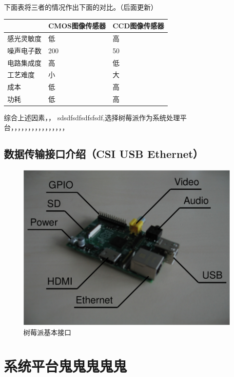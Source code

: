 下面表将三者的情况作出下面的对比。（后面更新）

\begin{table}[ht]
	
	\begin{tabular}{|L{2.2cm}|C{4cm}|R{4cm}|}
		\toprule[1pt]
		\hline
		& CMOS图像传感器 & CCD图像传感器 \\ \hline
		感光灵敏度 & 低 & 高 \\ \hline
		噪声电子数 & 200 & 50 \\ \hline
		电路集成度 & 高 & 低 \\ \hline
		工艺难度 & 小 & 大 \\ \hline
		成本 & 低 & 高 \\ \hline
		功耗 & 低 & 高 \\  \hline
	\end{tabular} 
\end{table}

综合上述因素，，
sdsdfsdfsdfsfsdf,选择树莓派作为系统处理平台，，，，，，，，，，，，，，，，


\subsection{数据传输接口介绍（CSI USB Ethernet）}

\begin{figure}[h]
	\centering
	\includegraphics[width=0.7\linewidth]{Figure/rasp_1}
	\caption{树莓派基本接口}
	\label{fig:rasp_1}
\end{figure}


\section{系统平台鬼鬼鬼鬼鬼}